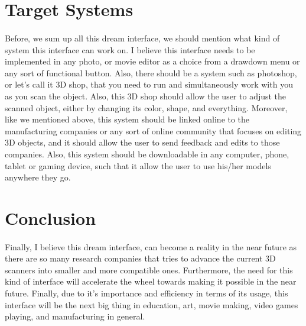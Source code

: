 \documentclass[12pt, oneside]{article}   	%
\begin{document}
\section{Target Systems}
\paragraph{}
Before, we sum up all this dream interface, we should mention what kind of system this interface can work on.  I believe this interface needs to be implemented in any photo, or movie editor as a choice from a drawdown menu or any sort of functional button.  Also, there should be a system such as photoshop, or let's call it 3D shop, that you need to run and simultaneously work with you as you scan the object.  Also, this 3D shop should allow the user to adjust the scanned object, either by changing its color, shape, and everything. Moreover, like we mentioned above, this system should be linked online to the manufacturing companies or any sort of online community that focuses on editing 3D objects, and it should allow the user to send feedback and edits to those companies.  Also, this system should be downloadable in any computer, phone, tablet or gaming device, such that it allow the user to use his/her models anywhere they go. 
\section{Conclusion}
\paragraph{}
Finally, I believe this dream interface, can become a reality in the near future as there are so many research companies that tries to advance the current 3D scanners into smaller and more compatible ones.  Furthermore, the need for this kind of interface will accelerate the wheel towards making it possible in the near future. Finally, due to it's importance and efficiency in terms of its usage, this interface will be the next big thing in education, art, movie making, video games playing, and manufacturing in general.
\end{document}
